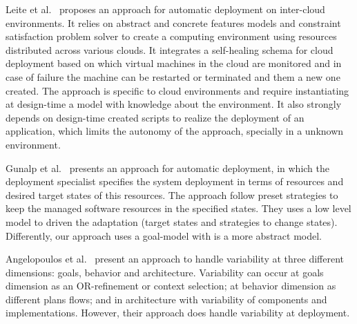 Leite et al.~\cite{ferreira_leite_user_2014} proposes an approach for automatic deployment on inter-cloud environments. It relies on abstract and concrete features models and constraint satisfaction problem solver to create a computing environment using resources distributed across various clouds.
It integrates a self-healing schema for cloud deployment based on which virtual machines in the cloud are monitored and in case of failure the machine can be
restarted or terminated and them a new one created.
The approach is specific to cloud environments and require instantiating at design-time a model with knowledge about the environment.
It also strongly depends on design-time created scripts to realize the deployment of an application, which limits the autonomy of the approach, specially in a unknown environment.

Gunalp et al.~\citep{gunalp_rondo_2015} presents an approach for automatic deployment, in which the deployment specialist specifies the system deployment in terms of resources and desired target states of this resources. The approach follow preset strategies to keep the managed software resources in the specified states. They uses a low level model to driven the adaptation (target states and strategies to change states). Differently, our approach uses a goal-model with is a more abstract model.

Angelopoulos et al.~\cite{angelopoulos_capturing_2015} present an approach to handle  variability at three different dimensions: goals, behavior and architecture. Variability can occur at goals dimension as an OR-refinement or context selection; at behavior dimension as different plans flows; and in architecture with variability of components and implementations. However, their approach does handle variability at deployment.


